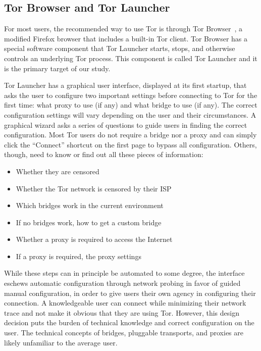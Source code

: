 \documentclass[USenglish,oneside,twocolumn]{article}
\begin{document}

\subsection{Tor Browser and Tor Launcher}

For most users, the recommended way to use Tor is through Tor Browser~\cite{torbrowser},
a modified Firefox browser that includes a built-in Tor client.
Tor Browser has a special software component that
Tor Launcher starts, stops, and otherwise controls
an underlying Tor process.
This component is called Tor Launcher
and it is the primary target of our study.

Tor Launcher has a graphical user interface,
displayed at its first startup, that asks the user
to configure two important settings before connecting to Tor
for the first time:
what proxy to use (if any) and what bridge to use (if any).
The correct configuration settings will vary depending
on the user and their circumstances.
A graphical wizard asks a series of questions to guide
users in finding the correct configuration.
Most Tor users do not require a bridge nor a proxy and
can simply click the ``Connect'' shortcut on
the first page to bypass all configuration.
Others, though, need to know or find out
all these pieces of information:

\begin{itemize}
	\item{Whether they are censored} 
	\item{Whether the Tor network is censored by their ISP}
	\item{Which bridges work in the current environment} 
	\item{If no bridges work, how to get a custom bridge} 
	\item{Whether a proxy is required to access the Internet}
	\item{If a proxy is required, the proxy settings}
\end{itemize}

While these steps can in principle be automated to some degree,
the interface eschews automatic configuration through network probing
in favor of guided manual configuration,
in order to give users their own agency in configuring their connection.
A knowledgeable user can connect while minimizing their network trace
and not make it obvious that they are using Tor.
However, this design decision puts the burden of technical knowledge and correct configuration on the user.
The technical concepts of bridges, pluggable transports, and proxies are likely unfamiliar to the average user.
\end{document}
